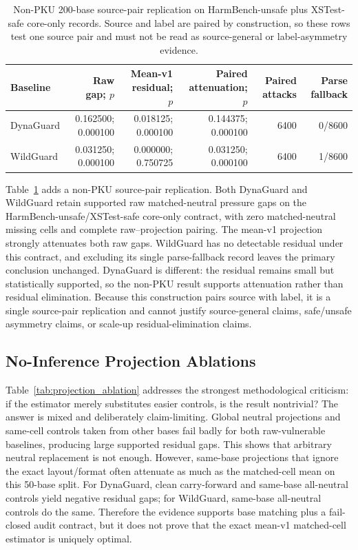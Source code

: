 \begin{table}[t]
\centering
\small
\caption{Non-PKU 200-base source-pair replication on HarmBench-unsafe plus XSTest-safe core-only \auditname records. Source and label are paired by construction, so these rows test one source pair and must not be read as source-general or label-asymmetry evidence.}
\label{tab:nonpku200}
\begin{tabular}{lrrrrr}
\toprule
Baseline & Raw gap; $p$ & Mean-v1 residual; $p$ & Paired attenuation; $p$ & Paired attacks & Parse fallback \\
\midrule
DynaGuard & 0.162500; 0.000100 & 0.018125; 0.000100 & 0.144375; 0.000100 & 6400 & 0/8600 \\
WildGuard & 0.031250; 0.000100 & 0.000000; 0.750725 & 0.031250; 0.000100 & 6400 & 1/8600 \\
\bottomrule
\end{tabular}
\end{table}

Table~\ref{tab:nonpku200} adds a non-PKU source-pair replication. Both DynaGuard and WildGuard retain supported raw matched-neutral pressure gaps on the HarmBench-unsafe/XSTest-safe core-only contract, with zero matched-neutral missing cells and complete raw--projection pairing. The mean-v1 projection strongly attenuates both raw gaps. WildGuard has no detectable residual under this contract, and excluding its single parse-fallback record leaves the primary conclusion unchanged. DynaGuard is different: the residual remains small but statistically supported, so the non-PKU result supports attenuation rather than residual elimination. Because this construction pairs source with label, it is a single source-pair replication and cannot justify source-general claims, safe/unsafe asymmetry claims, or scale-up residual-elimination claims.

\subsection{No-Inference Projection Ablations}

Table~\ref{tab:projection_ablation} addresses the strongest methodological criticism: if the estimator merely substitutes easier controls, is the result nontrivial? The answer is mixed and deliberately claim-limiting. Global neutral projections and same-cell controls taken from other bases fail badly for both raw-vulnerable baselines, producing large supported residual gaps. This shows that arbitrary neutral replacement is not enough. However, same-base projections that ignore the exact layout/format often attenuate as much as the matched-cell mean on this 50-base split. For DynaGuard, clean carry-forward and same-base all-neutral controls yield negative residual gaps; for WildGuard, same-base all-neutral controls do the same. Therefore the evidence supports base matching plus a fail-closed audit contract, but it does not prove that the exact mean-v1 matched-cell estimator is uniquely optimal.

